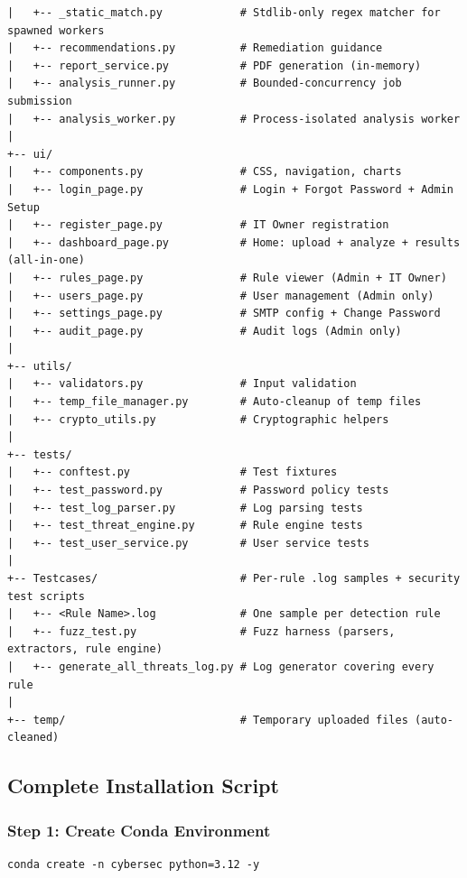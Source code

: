 \documentclass[12pt,a4paper]{article}
\begin{document}
\begin{tcolorbox}[colback=blue!3!white, colframe=darkblue, arc=5pt, boxrule=0.8pt, left=5pt, right=5pt, top=5pt, bottom=5pt, fontupper=\ttfamily\scriptsize]
\begin{verbatim}
|   +-- _static_match.py            # Stdlib-only regex matcher for spawned workers
|   +-- recommendations.py          # Remediation guidance
|   +-- report_service.py           # PDF generation (in-memory)
|   +-- analysis_runner.py          # Bounded-concurrency job submission
|   +-- analysis_worker.py          # Process-isolated analysis worker
|
+-- ui/
|   +-- components.py               # CSS, navigation, charts
|   +-- login_page.py               # Login + Forgot Password + Admin Setup
|   +-- register_page.py            # IT Owner registration
|   +-- dashboard_page.py           # Home: upload + analyze + results (all-in-one)
|   +-- rules_page.py               # Rule viewer (Admin + IT Owner)
|   +-- users_page.py               # User management (Admin only)
|   +-- settings_page.py            # SMTP config + Change Password
|   +-- audit_page.py               # Audit logs (Admin only)
|
+-- utils/
|   +-- validators.py               # Input validation
|   +-- temp_file_manager.py        # Auto-cleanup of temp files
|   +-- crypto_utils.py             # Cryptographic helpers
|
+-- tests/
|   +-- conftest.py                 # Test fixtures
|   +-- test_password.py            # Password policy tests
|   +-- test_log_parser.py          # Log parsing tests
|   +-- test_threat_engine.py       # Rule engine tests
|   +-- test_user_service.py        # User service tests
|
+-- Testcases/                      # Per-rule .log samples + security test scripts
|   +-- <Rule Name>.log             # One sample per detection rule
|   +-- fuzz_test.py                # Fuzz harness (parsers, extractors, rule engine)
|   +-- generate_all_threats_log.py # Log generator covering every rule
|
+-- temp/                           # Temporary uploaded files (auto-cleaned)
\end{verbatim}
\end{tcolorbox}



\subsection{Complete Installation Script}

\subsubsection{Step 1: Create Conda Environment}

\begin{tcolorbox}[colback=gray!10!white, colframe=gray!70!black, arc=3pt, boxrule=0.5pt]
\begin{verbatim}
conda create -n cybersec python=3.12 -y
\end{verbatim}
\end{tcolorbox}
\end{document}
